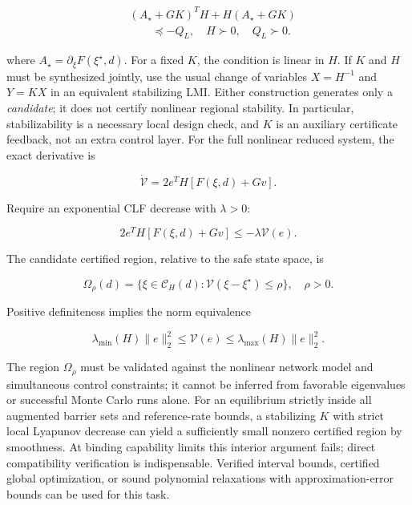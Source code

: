 \documentclass[11pt,twocolumn]{article}
\begin{document}
\begin{equation}\label{eq:lyapunov-linear}
\begin{aligned}
&(A_\star+GK)^TH+H(A_\star+GK)\\
&\qquad\preceq-Q_L,\quad H\succ0,\quad Q_L\succ0.
\end{aligned}
\end{equation}

where $A_\star=\partial_\xi F(\xi^\star,d)$. For a fixed $K$, the condition is linear in $H$. If $K$ and $H$ must be synthesized jointly, use the usual change of variables $X=H^{-1}$ and $Y=KX$ in an equivalent stabilizing LMI. Either construction generates only a \emph{candidate}; it does not certify nonlinear regional stability. In particular, stabilizability is a necessary local design check, and $K$ is an auxiliary certificate feedback, not an extra control layer. For the full nonlinear reduced system, the exact derivative is

\begin{equation}\label{eq:vdot}
\dot{\mathcal V}=2e^TH[F(\xi,d)+Gv].
\end{equation}

Require an exponential CLF decrease with $\lambda>0$:

\begin{equation}\label{eq:clf}
2e^TH[F(\xi,d)+Gv]\leq-\lambda\mathcal V(e).
\end{equation}

The candidate certified region, relative to the safe state space, is

\begin{equation}\label{eq:omega}
\Omega_\rho(d)=\{\xi\in\mathcal C_H(d):\mathcal V(\xi-\xi^\star)\leq\rho\},
\quad \rho>0.
\end{equation}

Positive definiteness implies the norm equivalence

\begin{equation}\label{eq:norm}
\lambda_{\min}(H)\|e\|_2^2\leq\mathcal V(e)
\leq\lambda_{\max}(H)\|e\|_2^2.
\end{equation}

The region $\Omega_\rho$ must be validated against the nonlinear network model and simultaneous control constraints; it cannot be inferred from favorable eigenvalues or successful Monte Carlo runs alone. For an equilibrium strictly inside all augmented barrier sets and reference-rate bounds, a stabilizing $K$ with strict local Lyapunov decrease can yield a sufficiently small nonzero certified region by smoothness. At binding capability limits this interior argument fails; direct compatibility verification is indispensable. Verified interval bounds, certified global optimization, or sound polynomial relaxations with approximation-error bounds can be used for this task.
\end{document}

